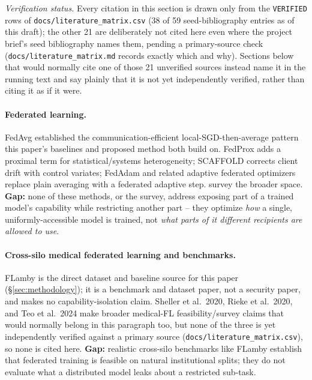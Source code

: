 \documentclass[11pt]{article}
\begin{document}
\emph{Verification status.} Every citation in this section is drawn only
from the \texttt{VERIFIED} rows of \texttt{docs/literature\_matrix.csv} (38
of 59 seed-bibliography entries as of this draft); the other 21 are
deliberately not cited here even where the project brief's seed
bibliography names them, pending a primary-source check
(\texttt{docs/literature\_matrix.md} records exactly which and why).
Sections below that would normally cite one of those 21 unverified sources
instead name it in the running text and say plainly that it is not yet
independently verified, rather than citing it as if it were.

\paragraph{Federated learning.} FedAvg \citep{mcmahan2017fedavg} established
the communication-efficient local-SGD-then-average pattern this paper's
baselines and proposed method both build on. FedProx \citep{li2020fedprox}
adds a proximal term for statistical/systems heterogeneity; SCAFFOLD
\citep{karimireddy2020scaffold} corrects client drift with control
variates; FedAdam and related adaptive federated optimizers
\citep{reddi2021adaptive} replace plain averaging with a federated adaptive
step. \citet{kairouz2021advances} survey the broader space. \textbf{Gap:}
none of these methods, or the survey, address exposing part of a trained
model's capability while restricting another part -- they optimize
\emph{how} a single, uniformly-accessible model is trained, not
\emph{what parts of it different recipients are allowed to use}.

\paragraph{Cross-silo medical federated learning and benchmarks.} FLamby
\citep{duterrail2022flamby} is the direct dataset and baseline source for
this paper (\S\ref{sec:methodology}); it is a benchmark and dataset paper,
not a security paper, and makes no capability-isolation claim.
Sheller et al.\ 2020, Rieke et al.\ 2020, and Teo et al.\ 2024 make broader
medical-FL feasibility/survey claims that would normally belong in this
paragraph too, but none of the three is yet independently verified against
a primary source (\texttt{docs/literature\_matrix.csv}), so none is cited
here. \textbf{Gap:} realistic cross-silo benchmarks like FLamby
establish that federated training is feasible on natural institutional
splits; they do not evaluate what a distributed model leaks about a
restricted sub-task.
\end{document}
